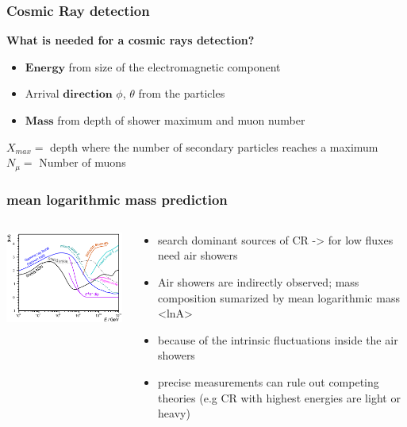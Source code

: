 \documentclass[aspectratio=1610, 9pt]{beamer}
\begin{document}
\begin{frame}\frametitle{Cosmic Ray detection}
  \textbf{What is needed for a cosmic rays detection?}
  \begin{itemize}
    \item $\symbf{Energy}$ from size of the electromagnetic component
    \item Arrival $\symbf{direction}$ $\phi$, $\theta$ from the particles
    \item $\symbf{Mass}$ from depth of shower maximum and muon number
  \end{itemize}
  $X_{max} =$ depth where the number of secondary particles reaches a maximum \\
  $N_{\mu} =$ Number of muons
\end{frame}

\begin{frame}\frametitle{mean logarithmic mass prediction}
  \begin{columns}
    \begin{column}[c]{0.48\textwidth}
      \includegraphics{lnA_left.png}
    \end{column}
    \begin{column}[c]{0.48\textwidth}
      \begin{itemize}
        \item search dominant sources of CR -> for low fluxes need air showers
        \item Air showers are indirectly observed; mass composition sumarized by
        mean logarithmic mass <lnA> %
        \item because of the intrinsic fluctuations inside the air showers
        \item precise measurements can rule out competing theories (e.g CR with
        highest energies are light or heavy)
      \end{itemize}
    \end{column}
  \end{columns}
\end{frame}
\end{document}
